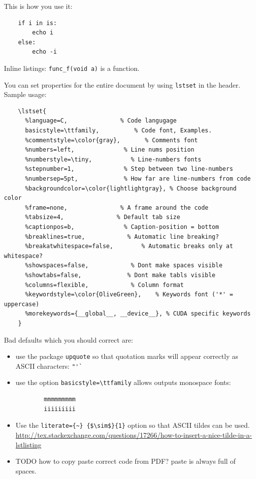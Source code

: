 \documentclass[12pt]{article}
\begin{document}
  This is how you use it:

  \begin{lstlisting}
    if i in is:
        echo i
    else:
        echo -i
  \end{lstlisting}

  Inline listings: \lstinline|func_f(void a)| is a function.

  You can set properties for the entire document by using \lstinline|lstset| in the header.
  Sample usage:

  \begin{lstlisting}
    \lstset{
      %language=C,               % Code langugage
      basicstyle=\ttfamily,          % Code font, Examples.
      %commentstyle=\color{gray},       % Comments font
      %numbers=left,              % Line nums position
      %numberstyle=\tiny,           % Line-numbers fonts
      %stepnumber=1,              % Step between two line-numbers
      %numbersep=5pt,             % How far are line-numbers from code
      %backgroundcolor=\color{lightlightgray}, % Choose background color
      %frame=none,               % A frame around the code
      %tabsize=4,               % Default tab size
      %captionpos=b,              % Caption-position = bottom
      %breaklines=true,            % Automatic line breaking?
      %breakatwhitespace=false,        % Automatic breaks only at whitespace?
      %showspaces=false,            % Dont make spaces visible
      %showtabs=false,             % Dont make tabls visible
      %columns=flexible,            % Column format
      %keywordstyle=\color{OliveGreen},    % Keywords font ('*' = uppercase)
      %morekeywords={__global__, __device__}, % CUDA specific keywords
    }
  \end{lstlisting}

  Bad defaults which you should correct are:

  \begin{itemize}
    \item use the package \lstinline|upquote| so that quotation marks will appear
      correctly as ASCII characters: \lstinline|"'`|
    \item use the option \lstinline|basicstyle=\ttfamily| allows outputs monospace fonts:
      \begin{lstlisting}
        mmmmmmmmm
        iiiiiiiii
      \end{lstlisting}
    \item Use the \lstinline|literate={~} {$\sim$}{1}| option so that ASCII tildes can be used.
      \url{http://tex.stackexchange.com/questions/17266/how-to-insert-a-nice-tilde-in-a-lstlisting}
    \item TODO how to copy paste correct code from PDF? paste is always full of spaces.
  \end{itemize}
\end{document}
